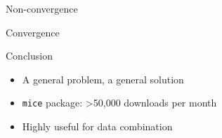 \documentclass[ignorenonframetext,aspectratio=43]{beamer}
\providecommand{\tightlist}{%
  \setlength{\itemsep}{0pt}\setlength{\parskip}{0pt}}
\begin{document}
\begin{frame}{Non-convergence}
\protect\hypertarget{non-convergence}{}


\end{frame}

\begin{frame}{Convergence}
\protect\hypertarget{convergence}{}


\end{frame}

\begin{frame}[fragile]{Conclusion}
\protect\hypertarget{conclusion}{}

\begin{itemize}
\tightlist
\item
  A general problem, a general solution
\item
  \texttt{mice} package: \textgreater{}50,000 downloads per month
\item
  Highly useful for data combination
\end{itemize}

\end{frame}
\end{document}
